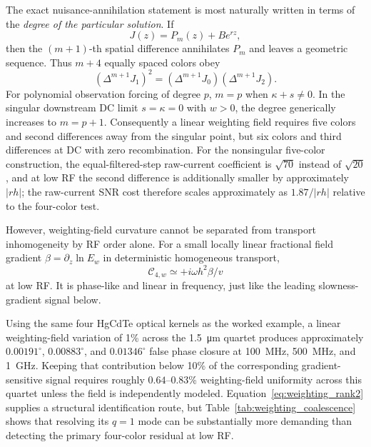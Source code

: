 \documentclass[11pt]{article}
\begin{document}
The exact nuisance-annihilation statement is most naturally written in terms of the \emph{degree of the particular solution}. If
\begin{equation}
J(z)=P_m(z)+Be^{rz},
\end{equation}
then the $(m+1)$-th spatial difference annihilates $P_m$ and leaves a geometric sequence. Thus $m+4$ equally spaced colors obey
\begin{equation}
\boxed{(\Delta^{m+1}J_1)^2=(\Delta^{m+1}J_0)(\Delta^{m+1}J_2).}
\label{eq:poly_annihilation}
\end{equation}
For polynomial observation forcing of degree $p$, $m=p$ when $\kappa+s\neq0$. In the singular downstream DC limit $s=\kappa=0$ with $w>0$, the degree generically increases to $m=p+1$. Consequently a linear weighting field requires five colors and second differences away from the singular point, but six colors and third differences at DC with zero recombination. For the nonsingular five-color construction, the equal-filtered-step raw-current coefficient is $\sqrt{70}$ instead of $\sqrt{20}$, and at low RF the second difference is additionally smaller by approximately $|rh|$; the raw-current SNR cost therefore scales approximately as $1.87/|rh|$ relative to the four-color test.

However, weighting-field curvature cannot be separated from transport inhomogeneity by RF order alone. For a small locally linear fractional field gradient $\beta=\partial_z\ln E_w$ in deterministic homogeneous transport,
\begin{equation}
\boxed{\mathcal C_{4,w}\simeq+i\omega h^2\beta/v}
\label{eq:weighting_lowrf}
\end{equation}
at low RF. It is phase-like and linear in frequency, just like the leading slowness-gradient signal below.

Using the same four HgCdTe optical kernels as the worked example, a linear weighting-field variation of 1\% across the \SI{1.5}{\micro\meter} quartet produces approximately $0.00191^\circ$, $0.00883^\circ$, and $0.01346^\circ$ false phase closure at \SI{100}{MHz}, \SI{500}{MHz}, and \SI{1}{GHz}. Keeping that contribution below 10\% of the corresponding gradient-sensitive signal requires roughly $0.64$--$0.83$\% weighting-field uniformity across this quartet unless the field is independently modeled. Equation~\eqref{eq:weighting_rank2} supplies a structural identification route, but Table~\ref{tab:weighting_coalescence} shows that resolving its $q=1$ mode can be substantially more demanding than detecting the primary four-color residual at low RF.
\end{document}
